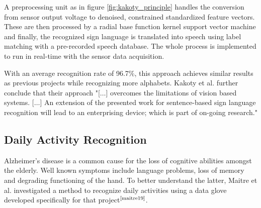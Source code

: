 \documentclass[hyperref, bachelorofscience]{cgvpub}
\newcommand{\newcite}[1]{$ ^{\text{\cite{#1}}} $}
\begin{document}
A preprocessing unit as in figure \ref{fig:kakoty_principle} handles the conversion from sensor output voltage to denoised, constrained standardized feature vectors. These are then processed by a radial base function kernel support vector machine and finally, the recognized sign language is translated into speech using label matching with a pre-recorded speech database. The whole process is implemented to run in real-time with the sensor data acquisition.

With an average recognition rate of 96.7\%, this approach achieves similar results as previous projects while recognizing more alphabets. Kakoty et al. further conclude that their approach "[$\dots$] overcomes the limitations of vision based systems. [$\dots$] An extension of the presented work for sentence-based sign language recognition will lead to an enterprising device; which is part of on-going research."

\subsection{Daily Activity Recognition}
Alzheimer's disease is a common cause for the loss of cognitive abilities amongst the elderly. Well known symptoms include language problems, loss of memory and degrading functioning of the hand. To better understand the latter, Maitre et al. investigated a method to recognize daily activities using a data glove developed specifically for that project\newcite{maitre19}.
\end{document}
